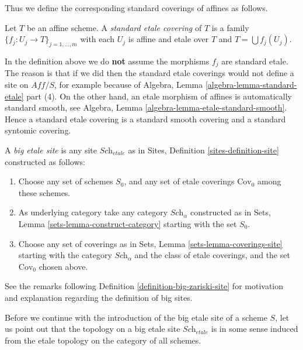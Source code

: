 \noindent
Thus we define the corresponding standard coverings of affines as follows.

\begin{definition}
\label{definition-standard-etale}
Let $T$ be an affine scheme. A {\it standard etale covering}
of $T$ is a family $\{f_j : U_j \to T\}_{j = 1, \ldots, m}$
with each $U_j$ is affine and etale over $T$ and
$T = \bigcup f_j(U_j)$.
\end{definition}

\noindent
In the definition above we do {\bf not} assume the morphisms $f_j$ are
standard etale. The reason is that if we did then the standard etale
coverings would not define a site on $\textit{Aff}/S$, for example because of
Algebra, Lemma \ref{algebra-lemma-standard-etale} part (4).
On the other hand, an etale morphism of affines is automatically
standard smooth, see
Algebra, Lemma \ref{algebra-lemma-etale-standard-smooth}.
Hence a standard etale covering is a standard smooth
covering and a standard syntomic covering.

\begin{definition}
\label{definition-big-etale-site}
A {\it big etale site} is any site $\textit{Sch}_{etale}$ as in
Sites, Definition \ref{sites-definition-site} constructed as follows:
\begin{enumerate}
\item Choose any set of schemes $S_0$, and any set of etale coverings
$\text{Cov}_0$ among these schemes.
\item As underlying category take any category $\textit{Sch}_\alpha$
constructed as in Sets, Lemma \ref{sets-lemma-construct-category}
starting with the set $S_0$.
\item Choose any set of coverings as in
Sets, Lemma \ref{sets-lemma-coverings-site} starting with the
category $\textit{Sch}_\alpha$ and the class of etale coverings,
and the set $\text{Cov}_0$ chosen above.
\end{enumerate}
\end{definition}

\noindent
See the remarks following Definition \ref{definition-big-zariski-site}
for motivation and explanation regarding the definition of big sites.

\medskip\noindent
Before we continue with the introduction of the big etale site of
a scheme $S$, let us point out that the topology on a big etale site
$\textit{Sch}_{etale}$ is in some sense induced from the etale topology
on the category of all schemes.

